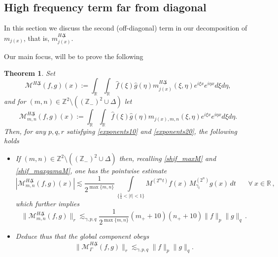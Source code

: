 \documentclass{amsart}
\newcommand{\R}{\mathbb{R}}
\newcommand{\Z}{\mathbb{Z}}
\newcommand{\g}{\gamma}
\newcommand{\M}{\mathcal{M}}
\newtheorem{theorem}{Theorem}[section]
\theoremstyle{definition}
\theoremstyle{remark}
\numberwithin{equation}{section}
\begin{document}
\subsection{High frequency term far from diagonal}

In this section we discuss the second (off-diagonal) term in our decomposition of $m_{j(x)}$, that is, $m_{j(x)}^{H\not\Delta}$.

Our main focus, will be to prove the following

\begin{theorem}\label{far_theorem}
 Set
 \begin{equation}\label{operator_far}
 \M^{H\not\Delta}(f,g)(x):=\int_\R \int_\R \hat{f}(\xi)\hat{g}(\eta)m_{j(x)}^{H\not\Delta}(\xi,\eta)e^{i\xi x}e^{i\eta
x}d\xi d\eta,
 \end{equation}
 and for $(m,n)\in\Z^2\setminus((\Z_-)^2\cup\Delta)$ let
  \begin{equation}\label{operator_far}
 \M^{H\not\Delta}_{m,n}(f,g)(x):=\int_\R \int_\R \hat{f}(\xi)\hat{g}(\eta)m_{j(x),m,n}(\xi,\eta)e^{i\xi x}e^{i\eta
 	x}d\xi d\eta.
 \end{equation}
 Then, for any $p, q, r$ satisfying \eqref{exponents10} and  \eqref{exponents20}, the following holds
 \begin{itemize}
 	\item If $(m,n)\in\Z^2\setminus((\Z_-)^2\cup\Delta)$ then, recalling \eqref{shif_maxM} and \eqref{shif_maxgamaM}, one has the pointwise estimate
  \begin{equation}\label{mvst}
|\M^{H\not\Delta}_{m,n}(f,g)(x)|\lesssim \frac{1}{2^{\max\{m,n\}}}\,\int\limits_{\{\frac{1}{4} <|t|<1 \}} M^{(2^m t)}f(x)\,M^{(2^n)}_{\g_t} g(x)\,dt\:\:\:\:\:\:\:\:\forall\:x\in\R\,,
\end{equation}
which further implies
 	\begin{equation}
 	\|\M^{H\not\Delta}_{m,n}(f,g)\|_r\lesssim_{\gamma,p,q}\frac{1}{2^{\max\{m,n\}}}(m_++10) (n_++10)\|f\|_p\|g\|_{q}\,.\label{far_bound}
 	\end{equation}

\item Deduce thus that the global component obeys
 	\begin{equation}
 	\|\M_\Gamma^{H\not\Delta}(f,g)\|_r\lesssim_{\gamma,p,q}\|f\|_p\|g\|_q.\label{far_thm_bound}
 	\end{equation}
 \end{itemize}
\end{theorem}
\end{document}
